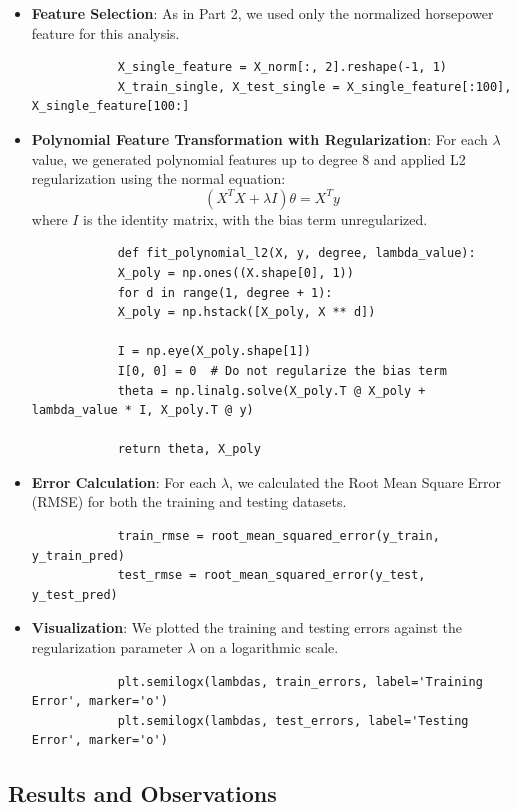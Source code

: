 \documentclass{article}
\begin{document}
	\begin{itemize}
		\item \textbf{Feature Selection}: As in Part 2, we used only the normalized horsepower feature for this analysis.
		\begin{verbatim}
			X_single_feature = X_norm[:, 2].reshape(-1, 1)
			X_train_single, X_test_single = X_single_feature[:100], X_single_feature[100:]
		\end{verbatim}
		
		\item \textbf{Polynomial Feature Transformation with Regularization}: For each $\lambda$ value, we generated polynomial features up to degree 8 and applied L2 regularization using the normal equation:
		$$(X^T X + \lambda I) \theta = X^T y$$
		where $I$ is the identity matrix, with the bias term unregularized.
		\begin{verbatim}
			def fit_polynomial_l2(X, y, degree, lambda_value):
			X_poly = np.ones((X.shape[0], 1))
			for d in range(1, degree + 1):
			X_poly = np.hstack([X_poly, X ** d])
			
			I = np.eye(X_poly.shape[1])
			I[0, 0] = 0  # Do not regularize the bias term
			theta = np.linalg.solve(X_poly.T @ X_poly + lambda_value * I, X_poly.T @ y)
			
			return theta, X_poly
		\end{verbatim}
		
		\item \textbf{Error Calculation}: For each $\lambda$, we calculated the Root Mean Square Error (RMSE) for both the training and testing datasets.
		\begin{verbatim}
			train_rmse = root_mean_squared_error(y_train, y_train_pred)
			test_rmse = root_mean_squared_error(y_test, y_test_pred)
		\end{verbatim}
		
		\item \textbf{Visualization}: We plotted the training and testing errors against the regularization parameter $\lambda$ on a logarithmic scale.
		\begin{verbatim}
			plt.semilogx(lambdas, train_errors, label='Training Error', marker='o')
			plt.semilogx(lambdas, test_errors, label='Testing Error', marker='o')
		\end{verbatim}
	\end{itemize}
	
	 \subsection*{Results and Observations}
	
\end{document}
